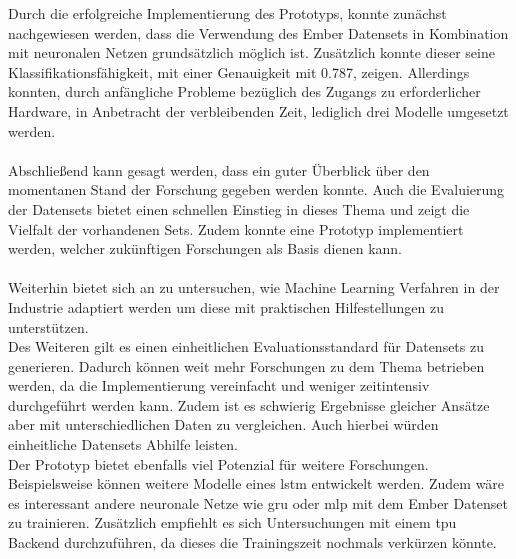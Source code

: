 \documentclass[
    12pt, %
    DIV10,
    ngerman, %
    a4paper, %
    oneside, %
    titlepage, %
    parskip=half, %
    headings=normal, %
    listof=totoc, %
    bibliography=totoc, %
    index=totoc, %
    captions=tableheading, %
    final %
]{scrreprt}
\begin{document}
Durch die erfolgreiche Implementierung des Prototyps, konnte zunächst nachgewiesen werden, dass die Verwendung des Ember Datensets in Kombination mit neuronalen Netzen grundsätzlich möglich ist. Zusätzlich konnte dieser seine Klassifikationsfähigkeit, mit einer Genauigkeit mit 0.787, zeigen. Allerdings konnten, durch anfängliche Probleme bezüglich des Zugangs zu erforderlicher Hardware, in Anbetracht der verbleibenden Zeit, lediglich drei Modelle umgesetzt werden.\\\\
Abschlie{\ss}end kann gesagt werden, dass ein guter Überblick über den momentanen Stand der Forschung gegeben werden konnte. Auch die Evaluierung der Datensets bietet einen schnellen Einstieg in dieses Thema und zeigt die Vielfalt der vorhandenen Sets. Zudem konnte eine Prototyp implementiert werden, welcher zukünftigen Forschungen als Basis dienen kann.
\\\\
Weiterhin bietet sich an zu untersuchen, wie Machine Learning Verfahren in der Industrie adaptiert werden um diese mit praktischen Hilfestellungen zu unterstützen.\\ Des Weiteren gilt es einen einheitlichen Evaluationsstandard für Datensets zu generieren. Dadurch können weit mehr Forschungen zu dem Thema betrieben werden, da die Implementierung vereinfacht und weniger zeitintensiv durchgeführt werden kann. Zudem ist es schwierig Ergebnisse gleicher Ansätze aber mit unterschiedlichen Daten zu vergleichen. Auch hierbei würden einheitliche Datensets Abhilfe leisten.\\
Der Prototyp bietet ebenfalls viel Potenzial für weitere Forschungen. Beispielsweise können weitere Modelle eines \ac{lstm} entwickelt werden. Zudem wäre es interessant andere neuronale Netze wie \ac{gru} oder \ac{mlp} mit dem Ember Datenset zu trainieren. Zusätzlich empfiehlt es sich Untersuchungen mit einem \ac{tpu} Backend durchzuführen, da dieses die Trainingszeit nochmals verkürzen könnte.

\newpage
{}
%
%
\printbibheading[heading=bibnumbered]
%
%
\printbibliography[notkeyword=internet, heading=subbibliography, %
   title={Bücher und Journals}]
\printbibliography[keyword=internet, heading=subbibliography, %
   title={Internetquellen}]

\appendix
\newpage
\end{document}
